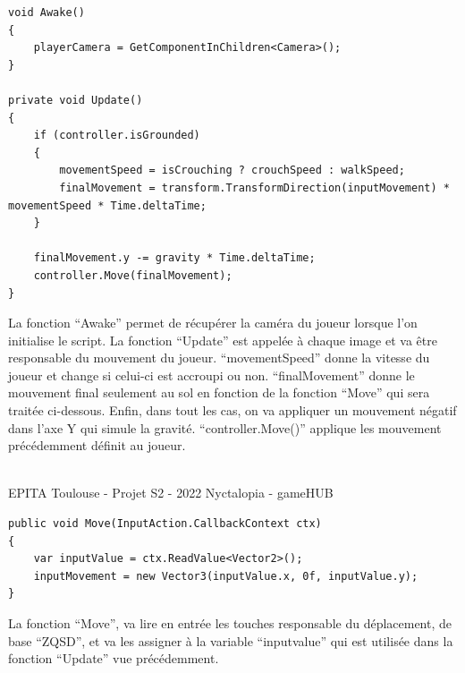 \begin{lstlisting}[language={[Sharp]C}, caption={Fonctions C\# Awake / Update}, label={ScriptAwake}]
void Awake()
{
	playerCamera = GetComponentInChildren<Camera>();
}

private void Update()
{
	if (controller.isGrounded)
	{
		movementSpeed = isCrouching ? crouchSpeed : walkSpeed;
		finalMovement = transform.TransformDirection(inputMovement) * movementSpeed * Time.deltaTime;
	}

	finalMovement.y -= gravity * Time.deltaTime;
    controller.Move(finalMovement);
}
\end{lstlisting}
La fonction ``Awake'' permet de récupérer la caméra du joueur lorsque l'on initialise le script.
La fonction ``Update'' est appelée à chaque image et va être responsable du mouvement du joueur.
``movementSpeed'' donne la vitesse du joueur et change si celui-ci est accroupi ou non.
``finalMovement'' donne le mouvement final seulement au sol en fonction de la fonction ``Move'' qui sera traitée ci-dessous.
Enfin, dans tout les cas, on va appliquer un mouvement négatif dans l'axe Y qui simule la gravité.
``controller.Move()'' applique les mouvement précédemment définit au joueur.

\vfill
\noindent\makebox[\linewidth]{\rule{.8\paperwidth}{.6pt}}\\[0.2cm]
EPITA Toulouse - Projet S2 - 2022 \hfill Nyctalopia - gameHUB
\noindent\makebox[\linewidth]{\rule{.8\paperwidth}{.6pt}}
\newpage

\begin{lstlisting}[language={[Sharp]C}, caption={Fonction C\# Move}, label={ScriptMove}]
public void Move(InputAction.CallbackContext ctx)
{
    var inputValue = ctx.ReadValue<Vector2>();
    inputMovement = new Vector3(inputValue.x, 0f, inputValue.y);
}
\end{lstlisting}

La fonction ``Move'', va lire en entrée les touches responsable du déplacement, de base ``ZQSD'', et va les assigner à la variable ``inputvalue'' qui est utilisée dans la fonction ``Update'' vue précédemment.
\newline

